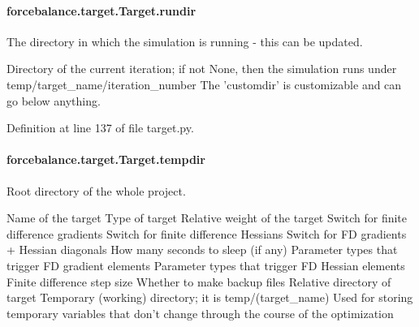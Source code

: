 \hypertarget{classforcebalance_1_1target_1_1Target_a6872de5b2d4273b82336ea5b0da29c9e}{
\paragraph[{rundir}]{\setlength{\rightskip}{0pt plus 5cm}forcebalance.\-target.\-Target.\-rundir\hspace{0.3cm}{\ttfamily [inherited]}}}\label{classforcebalance_1_1target_1_1Target_a6872de5b2d4273b82336ea5b0da29c9e}


The directory in which the simulation is running -\/ this can be updated. 

Directory of the current iteration; if not None, then the simulation runs under temp/target\-\_\-name/iteration\-\_\-number The 'customdir' is customizable and can go below anything.

Definition at line 137 of file target.\-py.

\hypertarget{classforcebalance_1_1target_1_1Target_aa1f01b5b78db253b5b66384ed11ed193}{
\paragraph[{tempdir}]{\setlength{\rightskip}{0pt plus 5cm}forcebalance.\-target.\-Target.\-tempdir\hspace{0.3cm}{\ttfamily [inherited]}}}\label{classforcebalance_1_1target_1_1Target_aa1f01b5b78db253b5b66384ed11ed193}


Root directory of the whole project. 

Name of the target Type of target Relative weight of the target Switch for finite difference gradients Switch for finite difference Hessians Switch for F\-D gradients + Hessian diagonals How many seconds to sleep (if any) Parameter types that trigger F\-D gradient elements Parameter types that trigger F\-D Hessian elements Finite difference step size Whether to make backup files Relative directory of target Temporary (working) directory; it is temp/(target\-\_\-name) Used for storing temporary variables that don't change through the course of the optimization 

